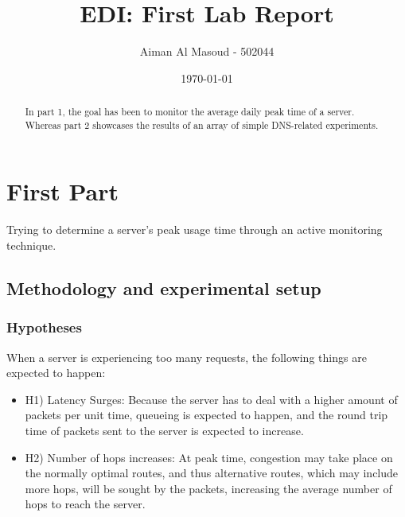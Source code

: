 \documentclass[a4paper,10pt]{article}
\begin{document}
\title{EDI: First Lab Report}
\author{Aiman Al Masoud - 502044}
\date{\today}

\maketitle

\begin{abstract}

In part 1, the goal has been to monitor the average daily peak time of a server. Whereas part 2 showcases the results of an array of simple DNS-related experiments.

\end{abstract}

\clearpage

\setcounter{page}{1}

\section{First Part}
Trying to determine a server's peak usage time through an active monitoring technique.

\subsection{Methodology and experimental setup}

\maketitle
\subsubsection{Hypotheses}


When a server is experiencing too many requests, the following things are expected to happen: 


\begin{itemize}

\item \label{hyp1} H1) Latency Surges: Because the server has to deal with a higher amount of packets per unit time, queueing is expected to happen, and the round trip time of packets sent to the server is expected to increase.

\item H2) Number of hops increases: At peak time, congestion may take place on the normally optimal routes, and thus alternative routes, which may include more hops, will be sought by the packets, increasing the average number of hops to reach the server.

\end{itemize}
\end{document}
